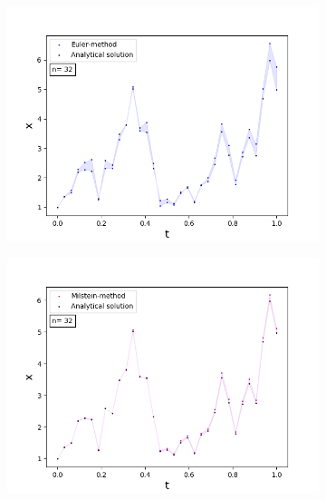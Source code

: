 \begin{figure}[!h]
\centering
   \begin{subfigure}{0.49\linewidth} \centering
     \includegraphics[scale=0.4]{Content/Graphics/Appendix/1gbm2}
   \end{subfigure}
   \begin{subfigure}{0.49\linewidth} \centering
     \includegraphics[scale=0.4]{Content/Graphics/Appendix/2gbm2}
   \end{subfigure}
   \begin{subfigure}{0.49\linewidth} \centering

\end{subfigure}
\end{figure}
